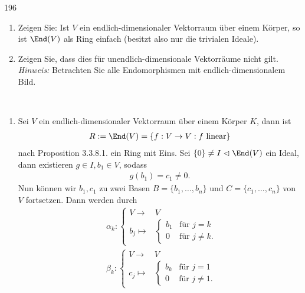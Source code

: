 \begin{algebraUE}{196}
\leavevmode \\
\begin{enumerate}
  \item Zeigen Sie: Ist $V$ ein endlich-dimensionaler Vektorraum über einem
  Körper, so ist $\End(V)$ als Ring einfach (besitzt also nur die trivialen Ideale).
  \item Zeigen Sie, dass dies für unendlich-dimensionale Vektorräume nicht gilt. \\
  \textit{Hinweis:} Betrachten Sie alle Endomorphismen mit endlich-dimensionalem Bild.
\end{enumerate}
\end{algebraUE}
\begin{solution}
\leavevmode \\
\begin{enumerate}
  \item Sei $V$ ein endlich-dimensionaler Vektorraum über einem Körper $K$, dann ist
  \begin{align*}
    R := \End(V) = \{f: V \rightarrow V: f \text{ linear}\}
  \end{align*}
  nach Proposition 3.3.8.1. ein Ring mit Eins.
  Sei $\{0\} \neq I \vartriangleleft \End(V)$ ein Ideal, dann existieren
  $g \in I, b_1 \in V$, sodass
  \begin{align*}
    g(b_1) = c_1 \neq 0.
  \end{align*}
  Nun können wir $b_1,c_1$ zu zwei Basen $B = \{b_1,\dots,b_n\}$ und $C = \{c_1,\dots,c_n\}$ von $V$
  fortsetzen.
  Dann werden durch
  \begin{align*}
    &\alpha_k:\begin{cases} V  \rightarrow & V \\
      b_j  \mapsto & \begin{cases}
        b_1 & \text{für } j = k \\
        0 & \text{für } j \neq k.
        \end{cases}
        \end{cases} \\
    &\beta_k: \begin{cases} V \rightarrow & V \\
      c_j \mapsto & \begin{cases}
        b_k & \text{für } j = 1 \\
        0 & \text{für } j \neq 1.
        \end{cases}
        \end{cases}
  \end{align*}

\end{enumerate}
\end{solution}
